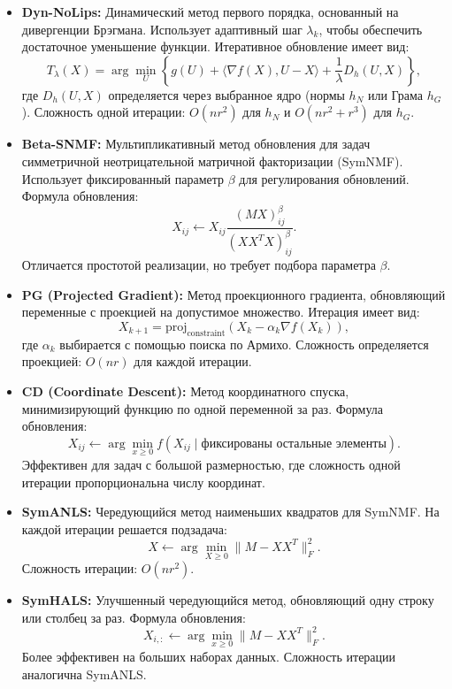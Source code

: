 \documentclass[a4paper,11pt]{article}
\begin{document}
\begin{itemize}
    \item \textbf{Dyn-NoLips:}
    Динамический метод первого порядка, основанный на дивергенции Брэгмана. Использует адаптивный шаг $\lambda_k$, чтобы
    обеспечить достаточное уменьшение функции. Итеративное обновление имеет вид:
    \[
    T_\lambda(X) = \arg\min_U \left\{ g(U) + \langle \nabla f(X), U - X \rangle + \frac{1}{\lambda} D_h(U, X) \right\},
    \]
    где $D_h(U, X)$ определяется через выбранное ядро (нормы $h_N$ или Грама $h_G$).
    Сложность одной итерации: $O(nr^2)$ для $h_N$ и $O(nr^2 + r^3)$ для $h_G$.

    \item \textbf{Beta-SNMF:}
    Мультипликативный метод обновления для задач симметричной неотрицательной матричной факторизации (SymNMF).
    Использует фиксированный параметр $\beta$ для регулирования обновлений. Формула обновления:
    \[
    X_{ij} \leftarrow X_{ij} \frac{(M X)_{ij}^\beta}{(X X^T X)_{ij}^\beta}.
    \]
    Отличается простотой реализации, но требует подбора параметра $\beta$.

    \item \textbf{PG (Projected Gradient):}
    Метод проекционного градиента, обновляющий переменные с проекцией на допустимое множество. Итерация имеет вид:
    \[
    X_{k+1} = \text{proj}_{\text{constraint}}(X_k - \alpha_k \nabla f(X_k)),
    \]
    где $\alpha_k$ выбирается с помощью поиска по Армихо.
    Сложность определяется проекцией: $O(nr)$ для каждой итерации.

    \item \textbf{CD (Coordinate Descent):}
    Метод координатного спуска, минимизирующий функцию по одной переменной за раз. Формула обновления:
    \[
    X_{ij} \leftarrow \arg\min_{x \geq 0} f(X_{ij} \mid \text{фиксированы остальные элементы}).
    \]
    Эффективен для задач с большой размерностью, где сложность одной итерации пропорциональна числу координат.

    \item \textbf{SymANLS:}
    Чередующийся метод наименьших квадратов для SymNMF. На каждой итерации решается подзадача:
    \[
    X \leftarrow \arg\min_{X \geq 0} \|M - XX^T\|_F^2.
    \]
    Сложность итерации: $O(nr^2)$.

    \item \textbf{SymHALS:}
    Улучшенный чередующийся метод, обновляющий одну строку или столбец за раз. Формула обновления:
    \[
    X_{i,:} \leftarrow \arg\min_{x \geq 0} \|M - XX^T\|_F^2.
    \]
    Более эффективен на больших наборах данных. Сложность итерации аналогична SymANLS.
\end{itemize}
\end{document}
